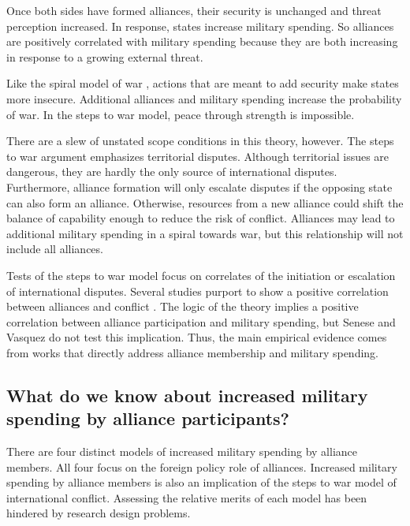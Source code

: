 \documentclass[12pt]{article}
\begin{document}
Once both sides have formed alliances, their security is unchanged and threat perception increased. 
In response, states increase military spending. 
So alliances are positively correlated with military spending because they are both increasing in response to a growing external threat. 

Like the spiral model of war \citep{Jervis1978}, actions that are meant to add security make states more insecure. 
Additional alliances and military spending increase the probability of war. 
In the steps to war model, peace through strength is impossible. 


There are a slew of unstated scope conditions in this theory, however.
The steps to war argument emphasizes territorial disputes. 
Although territorial issues are dangerous, they are hardly the only source of international disputes. 
Furthermore, alliance formation will only escalate disputes if the opposing state can also form an alliance.  
Otherwise, resources from a new alliance could shift the balance of capability enough to reduce the risk of conflict.
Alliances may lead to additional military spending in a spiral towards war, but this relationship will not include all alliances.   


Tests of the steps to war model focus on correlates of the initiation or escalation of international disputes. 
Several studies purport to show a positive correlation between alliances and conflict \citep{SeneseVasquez2008, Kenwicketal2015}. 
The logic of the theory implies a positive correlation between alliance participation and military spending, but Senese and Vasquez do not test this implication.  
Thus, the main empirical evidence comes from works that directly address alliance membership and military spending. 


\subsection{What do we know about increased military spending by alliance participants?} 


There are four distinct models of increased military spending by alliance members.
All four focus on the foreign policy role of alliances. 
Increased military spending by alliance members is also an implication of the steps to war model of international conflict. 
Assessing the relative merits of each model has been hindered by research design problems. 
\end{document}
